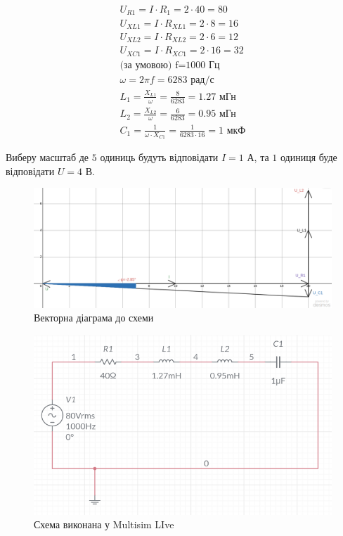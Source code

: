\documentclass{article}
\begin{document}
\begin{normalsize}
	\begin{gather}
		U_{R1}=I\cdot R_1=2\cdot40=80\nonumber\\
		U_{XL1}=I\cdot R_{XL1}=2\cdot8=16\nonumber\\
		U_{XL2}=I\cdot R_{XL2}=2\cdot6=12\nonumber\\
		U_{XC1}=I\cdot R_{XC1}=2\cdot16=32\nonumber\\
		\text{(за умовою) f=1000 Гц}\nonumber\\
		\omega=2\pi f=\text{6283 рад/с}\nonumber\\
		L_1=\frac{X_{L1}}{\omega}=\frac{8}{6283}=\text{1.27 мГн}\nonumber\\
		L_2=\frac{X_{L2}}{\omega}=\frac{6}{6283}=\text{0.95 мГн}\nonumber\\
		C_1=\frac{1}{\omega\cdot X_{C1}}=\frac{1}{6283\cdot16}=\text{1 мкФ}\nonumber
	\end{gather}

	Виберу масштаб де $5$ одиниць будуть відповідати $I=\text{1 А}$, та $1$ одиниця буде відповідати $U=\text{4 В}$.
	\begin{figure}[H]
		\centering
		\includegraphics[scale=0.35]{2}
		\caption{Векторна діаграма до схеми}
	\end{figure}

	\begin{figure}[H]
		\centering
		\includegraphics[scale=0.6]{1}
		\caption{Схема виконана у Multisim LIve}
	\end{figure}
	

\end{normalsize}
\end{document}
